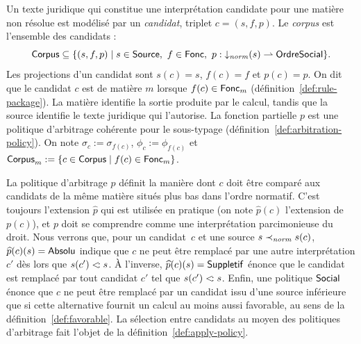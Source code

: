 \documentclass[review]{jflart}
\renewcommand{\Cand}{\ensuremath{\mathsf{Corpus}}}
\begin{document}
\begin{defi}\label{def:candidate}
Un texte juridique qui constitue une interprétation candidate pour une matière
non résolue est modélisé par un \emph{candidat}, triplet \(c=(s,f,p)\). Le
\emph{corpus} est l'ensemble des candidats :
\[
 \Cand \subseteq \{(s,f,p) \mid s\in\Source,\ f\in\Fun,\ p: \normdown(s)\rightharpoonup \Policy \}.
\]
Les projections d'un candidat sont \(s(c)=s\), \(f(c)=f\) et \(p(c)=p\). On dit que le
candidat \(c\) est de matière \(m\) lorsque \(f(c)\in\mathsf{Fonc}_m\)
(définition~\ref{def:rule-package}). La matière identifie la sortie produite par
le calcul, tandis que la source identifie le texte juridique qui l'autorise.
La fonction partielle \(p\) est une politique d'arbitrage cohérente pour le
sous-typage (définition~\ref{def:arbitration-policy}). On note
\(\sigma_c:=\sigma_{f(c)}\), \(\phi_c:=\phi_{f(c)}\) et
\(\Cand_m:=\{c\in\Cand\mid f(c)\in\Fun_m\}\).
\end{defi}

La politique d'arbitrage \(p\) définit la manière dont \(c\) doit être comparé
aux candidats de la même matière situés plus bas dans l'ordre normatif. C'est
toujours l'extension \(\widehat p\) qui est utilisée en pratique (on note
\(\widehat p(c)\) l'extension de \(p(c)\)), et \(p\) doit se comprendre comme
une interprétation parcimonieuse du droit. Nous verrons que, pour un
candidat~\(c\) et une source \(s\prec_{\mathit{norm}} s(c)\), \(\widehat p(c)(s)=\mathsf{Absolu}\)
indique que \(c\) ne peut être remplacé par une autre interprétation \(c'\) dès
lors que \(s(c')\mathrel{<\!:} s\). À l'inverse, \(\widehat p(c)(s)=\mathsf{Suppletif}\)
énonce que le candidat est remplacé par tout candidat \(c'\) tel que
\(s(c')\mathrel{<\!:} s\). Enfin, une politique \(\mathsf{Social}\) énonce que \(c\) ne peut
être remplacé par un candidat issu d'une source inférieure que si cette
alternative fournit un calcul au moins aussi favorable, au sens de la
définition~\ref{def:favorable}. La sélection entre candidats au moyen des
politiques d'arbitrage fait l'objet de la définition~\ref{def:apply-policy}.
\end{document}
